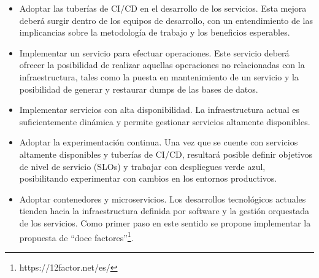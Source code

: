 \begin{itemize}
\item Adoptar las tuberías de CI/CD en el desarrollo de los
  servicios. Esta mejora deberá surgir dentro de los equipos de
  desarrollo, con un entendimiento de las implicancias sobre la
  metodología de trabajo y los beneficios esperables.
\item Implementar un servicio para efectuar operaciones. Este servicio
  deberá ofrecer la posibilidad de realizar aquellas operaciones no
  relacionadas con la infraestructura, tales como la puesta en
  mantenimiento de un servicio y la posibilidad de generar y restaurar
  dumps de las bases de datos.
\item Implementar servicios con alta disponibilidad. La
  infraestructura actual es suficientemente dinámica y permite
  gestionar servicios altamente disponibles.
\item Adoptar la experimentación continua. Una vez que se cuente con
  servicios altamente disponibles y tuberías de CI/CD, resultará
  posible definir objetivos de nivel de servicio (SLOs) y trabajar con
  despliegues verde azul, posibilitando experimentar con cambios en
  los entornos productivos.
\item Adoptar contenedores y microservicios. Los desarrollos
  tecnológicos actuales tienden hacia la infraestructura definida por
  software y la gestión orquestada de los servicios. Como primer paso
  en este sentido se propone implementar la propuesta de ``doce
  factores''\footnote{ https://12factor.net/es/}.
\end{itemize}
